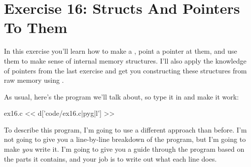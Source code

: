 \chapter{Exercise 16: Structs And Pointers To Them}

In this exercise you'll learn how to make a , point a pointer
at them, and use them to make sense of internal memory structures.  I'll also
apply the knowledge of pointers from the last exercise and get you
constructing these structures from raw memory using .

As usual, here's the program we'll talk about, so type it in and
make it work:

\begin{code}{ex16.c}
<< d['code/ex16.c|pyg|l'] >>
\end{code}

To describe this program, I'm going to use a different approach
than before.  I'm not going to give you a line-by-line breakdown
of the program, but I'm going to make \emph{you} write it.  I'm
going to give you a guide through the program based on the
parts it contains, and your job is to write out what each line does.

